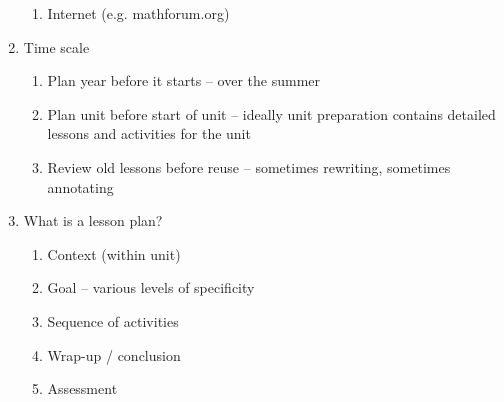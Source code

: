 \begin{enumerate}
\begin{enumerate}
			\item Internet (e.g. mathforum.org)

		\end{enumerate}

	\item Time scale
		\begin{enumerate}
			\item Plan year before it starts -- over the summer

			\item Plan unit before start of unit -- ideally unit preparation
				contains detailed lessons and activities for the unit

			\item Review old lessons before reuse -- sometimes rewriting,
				sometimes annotating

		\end{enumerate}

	\item What is a lesson plan?
		\begin{enumerate}
			\item Context (within unit)

			\item Goal -- various levels of specificity

			\item Sequence of activities

			\item Wrap-up / conclusion

			\item Assessment

		\end{enumerate}

\end{enumerate}

